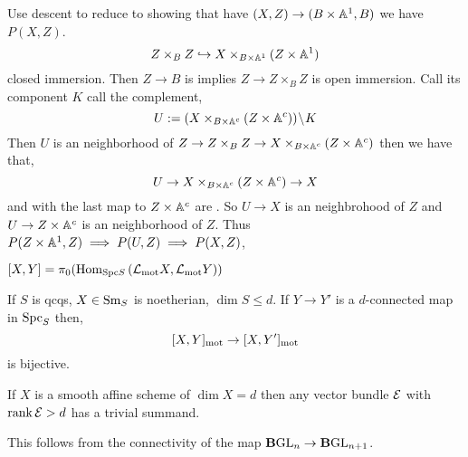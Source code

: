 \documentclass[12pt]{article}
\begin{document}
\begin{rmk}
Use descent to reduce to showing that have \etale $(X, Z) \to (B \times \mathbb{A}^1, B)$ we have $P(X, Z)$.
\[ Z \times_B Z \hookrightarrow X \times_{B \times \mathbb{A}^1} (Z \times \mathbb{A}^1) \]
closed immersion. Then $Z \to B$ is \etale implies $Z \to Z \times_B Z$ is open immersion. Call its component $K$ call the complement,
\[ U := (X \times_{B \times \mathbb{A}^c} (Z \times \mathbb{A}^c)) \! \setminus \! K \]
Then $U$ is an \etale neighborhood of $Z \to Z \times_B Z \to X \times_{B \times \mathbb{A}^c} (Z \times \mathbb{A}^c)$ 
then we have that,
\[ U \to X \times_{B \times \mathbb{A}^c} (Z \times \mathbb{A}^c) \to X \]
and with the last map to $Z \times \mathbb{A}^c$ are \etale. So $U \to X$ is an \etale neighbrohood of $Z$ and $U \to Z \times \mathbb{A}^c$ is an \etale neighborhood of $Z$. Thus $P(Z \times \mathbb{A}^1, Z) \implies P(U, Z) \implies P(X, Z)$,
\begin{center}
\end{center}
\end{rmk}

\begin{defn}
$[X, Y] = \pi_0(\mathrm{Hom}_{\mathrm{Spc}{S}} \left( \mathcal{L}_{\text{mot}} X, \mathcal{L}_{\text{mot}} Y) \right)$
\end{defn}

\begin{theorem}
If $S$ is qcqs, $X \in \mathrm{Sm}_S$ is noetherian, $\dim{S} \le d$. If $Y \to Y'$ is a $d$-connected map in $\mathrm{Spc}_S$ then,
\[ [X, Y]_{\text{mot}} \to [X, Y']_{\text{mot}} \]
is bijective.
\end{theorem}

\begin{theorem}
If $X$ is a smooth affine scheme of $\dim{X} = d$ then any vector bundle $\mathcal{E}$ with $\operatorname{\mathrm{rank}}{\mathcal{E}} > d$ has a trivial summand. 
\end{theorem}

\newcommand{\B}{\mathbf{B}}

\begin{rmk}
This follows from the connectivity of the map $\B \GL_n \to \B \GL_{n+1}$.
\end{rmk}
\end{document}

